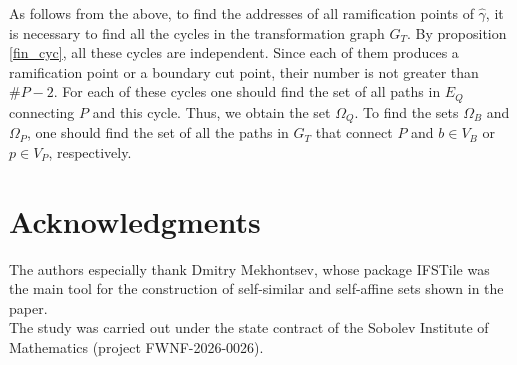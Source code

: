 \documentclass[11pt,reqno]{amsart}
\begin{document}
As follows from the above, to find the addresses of all ramification points of  $\hat\gamma$, it is necessary to find all the cycles in the transformation graph $G_T$.
 By proposition \ref{fin_cyc}, all these cycles are independent. Since each of them produces a ramification  point or a boundary cut point, their number is  not greater than $\#P-2$. For each of these cycles one should find the set of all paths in $E_Q$ connecting  $P$ and this cycle.  Thus, we obtain the set $\Omega_Q$.
To find the sets   $\Omega_B$ and $\Omega_P$, 
one should find the set of all the paths in $G_T$ 
that connect $P$ and $b \in V_B$ or $p \in V_P$, respectively. 
 






\section*{Acknowledgments}
The authors especially thank Dmitry Mekhontsev, whose package IFSTile \cite{IFStile} was the main  tool  for the construction  of self-similar and self-affine sets shown in the paper.\\
The study was carried out under the state contract of the Sobolev Institute of Mathematics (project FWNF-2026-0026).
\footnotesize
\end{document}
